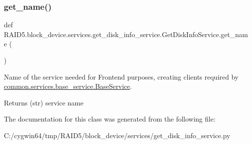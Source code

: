 \subsubsection{\texorpdfstring{get\+\_\+name()}{get\_name()}}
{\footnotesize\ttfamily def R\+A\+I\+D5.\+block\+\_\+device.\+services.\+get\+\_\+disk\+\_\+info\+\_\+service.\+Get\+Disk\+Info\+Service.\+get\+\_\+name (\begin{DoxyParamCaption}{ }\end{DoxyParamCaption})\hspace{0.3cm}{\ttfamily [static]}}



Name of the service needed for Frontend purposes, creating clients required by \hyperlink{class_r_a_i_d5_1_1common_1_1services_1_1base__service_1_1_base_service}{common.\+services.\+base\+\_\+service.\+Base\+Service}. 

\begin{DoxyReturn}{Returns}
(str) service name 
\end{DoxyReturn}


The documentation for this class was generated from the following file\+:\begin{DoxyCompactItemize}
\item 
C\+:/cygwin64/tmp/\+R\+A\+I\+D5/block\+\_\+device/services/get\+\_\+disk\+\_\+info\+\_\+service.\+py\end{DoxyCompactItemize}
